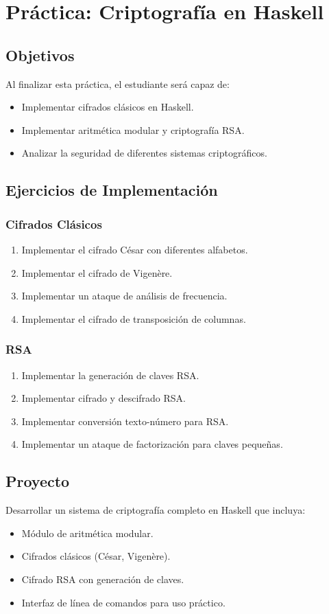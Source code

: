 \chapter{Práctica: Criptografía en Haskell}

\section{Objetivos}
Al finalizar esta práctica, el estudiante será capaz de:
\begin{itemize}
  \item Implementar cifrados clásicos en Haskell.
  \item Implementar aritmética modular y criptografía RSA.
  \item Analizar la seguridad de diferentes sistemas criptográficos.
\end{itemize}

\section{Ejercicios de Implementación}

\subsection{Cifrados Clásicos}
\begin{enumerate}
  \item Implementar el cifrado César con diferentes alfabetos.
  \item Implementar el cifrado de Vigenère.
  \item Implementar un ataque de análisis de frecuencia.
  \item Implementar el cifrado de transposición de columnas.
\end{enumerate}

\subsection{RSA}
\begin{enumerate}
  \item Implementar la generación de claves RSA.
  \item Implementar cifrado y descifrado RSA.
  \item Implementar conversión texto-número para RSA.
  \item Implementar un ataque de factorización para claves pequeñas.
\end{enumerate}

\section{Proyecto}
Desarrollar un sistema de criptografía completo en Haskell que incluya:
\begin{itemize}
  \item Módulo de aritmética modular.
  \item Cifrados clásicos (César, Vigenère).
  \item Cifrado RSA con generación de claves.
  \item Interfaz de línea de comandos para uso práctico.
\end{itemize}